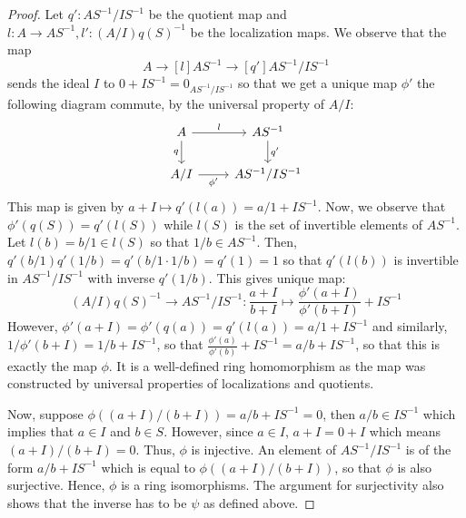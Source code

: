 \begin{proof}
Let $q' : AS^{-1}/IS^{-1}$ be the quotient map and
$l : A \to AS^{-1}, l' : (A/I)q(S)^{-1}$ be the localization maps.
We observe that the map
\[
A \to[l] AS^{-1} \to[q'] AS^{-1}/IS^{-1}
\]
sends the ideal $I$ to $0 + IS^{-1} = 0_{AS^{-1}/IS^{-1}}$ so that we get
a unique map $\phi'$ the following diagram commute, by the universal property
of $A/I$:
\[\begin{tikzcd}
A \ar[r, "l"] \ar[d, "q" left] & AS^{-1} \ar[d, "q'"] \\
A/I \ar[r, "\phi'" below] & AS^{-1}/IS^{-1}
\end{tikzcd}\]
This map is given by $a + I \mapsto q'(l(a)) = a/1 + IS^{-1}$.
Now, we observe that $\phi'(q(S)) = q'(l(S))$ while $l(S)$
is the set of invertible elements of $AS^{-1}$. Let $l(b) = b/1 \in l(S)$
so that $1/b \in AS^{-1}$. Then,
$q'(b/1)q'(1/b) = q'(b/1 \cdot 1/b) = q'(1) = 1$ so that $q'(l(b))$ is
invertible in $AS^{-1}/IS^{-1}$ with inverse $q'(1/b)$. This gives unique map:
\[
(A/I)q(S)^{-1} \to AS^{-1}/IS^{-1}
     : \frac{a + I}{b + I} \mapsto \frac{\phi'(a + I)}{\phi'(b + I)} + IS^{-1}
\]
However, $\phi'(a + I) = \phi'(q(a)) = q'(l(a)) = a/1 + IS^{-1}$
and similarly, $1/\phi'(b + I) = 1/b + IS^{-1}$, so that
$\frac{\phi'(a)}{\phi'(b)} + IS^{-1} = a/b + IS^{-1}$, so that this
is exactly the map $\phi$. It is a well-defined ring homomorphism
as the map was constructed by universal properties of localizations
and quotients.

Now, suppose $\phi((a + I)/(b + I)) = a/b + IS^{-1} = 0$,
then $a/b \in IS^{-1}$ which implies that $a \in I$ and $b \in S$.
However, since $a \in I$, $a + I = 0 + I$ which means
$(a + I)/(b + I) = 0$. Thus, $\phi$ is injective.
An element of $AS^{-1}/IS^{-1}$ is of the form $a/b + IS^{-1}$
which is equal to $\phi((a + I)/(b + I))$, so that $\phi$ is also
surjective. Hence, $\phi$ is a ring isomorphisms.
The argument for surjectivity also shows that the
inverse has to be $\psi$ as defined above.
\end{proof}

